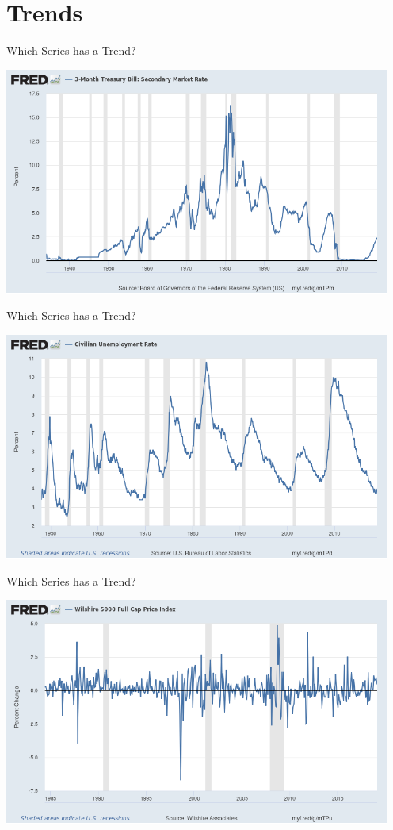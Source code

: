 \documentclass[aspectratio=169]{beamer}
\begin{document}
\section{Trends}

\begin{frame}{Which Series has a Trend?}
\begin{center}
\includegraphics[width=5in]{./resources/treasury_90.png}
\end{center}
\end{frame}

\begin{frame}{Which Series has a Trend?}
\begin{center}
\includegraphics[width=5in]{./resources/unemployment.png}
\end{center}
\end{frame}

\begin{frame}{Which Series has a Trend?}
\begin{center}
\includegraphics[width=5in]{./resources/wilshire_5000.png}
\end{center}
\end{frame}
\end{document}
